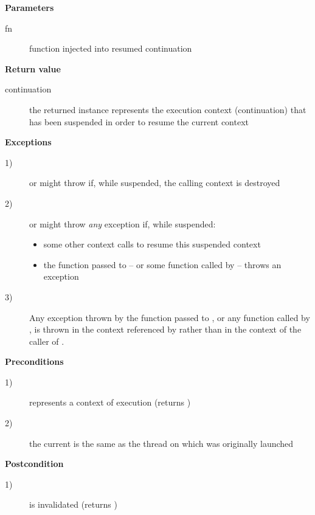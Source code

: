 {\bfseries Parameters}
\begin{description}
    \item[fn] function injected into resumed continuation\\
\end{description}

{\bfseries Return value}
\begin{description}
    \item[continuation] the returned instance represents the execution context
                        (continuation) that has been suspended in order to
                        resume the current context
\end{description}

{\bfseries Exceptions}
\begin{description}
    \item[1)] \resume or \resumewith might throw \unwindex if, while suspended,
              the calling context is destroyed
    \item[2)] \resume or \resumewith might throw \emph{any} exception if,
              while suspended:
              \begin{itemize}
                  \item some other context calls \resumewith to resume this
                        suspended context
                  \item the function  passed to \resumewith -- or some
                        function called by  -- throws an exception
              \end{itemize}
    \item[3)] Any exception thrown by the function  passed to
              \resumewith, or any function called by , is thrown in the
              context referenced by  rather than in the context of
              the caller of \resumewith.
\end{description}

{\bfseries Preconditions}
\begin{description}
    \item[1)]  represents a context of execution (\opbool returns
               )
    \item[2)] the current  is the same as the thread on which
               was originally launched
\end{description}

{\bfseries Postcondition}
\begin{description}
    \item[1)]  is invalidated (\opbool returns )
\end{description}

